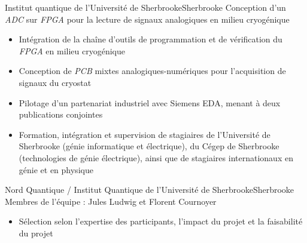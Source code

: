 
{Institut quantique de l'Université de Sherbrooke}{Sherbrooke}
{Conception d'un \textit{ADC} sur \textit{FPGA} pour la lecture de signaux analogiques en milieu cryogénique}
{\vspace{-12pt}
\begin{itemize}
    \item Intégration de la chaîne d'outils de programmation et de vérification du \textit{FPGA} en milieu cryogénique
    \item Conception de \textit{PCB} mixtes analogiques-numériques pour l'acquisition de signaux du cryostat
    \item Pilotage d'un partenariat industriel avec Siemens EDA, menant à deux publications conjointes
    \item Formation, intégration et supervision de stagiaires de l'Université de Sherbrooke (génie informatique et électrique), du Cégep de Sherbrooke (technologies de génie électrique), ainsi que de stagiaires internationaux en génie et en physique
\end{itemize}}


{Nord Quantique / Institut Quantique de l'Université de Sherbrooke}{Sherbrooke}
{Membres de l'équipe : Jules Ludwig et Florent Cournoyer}
{\vspace{-12pt}
\begin{itemize}
    \item Sélection selon l'expertise des participants, l'impact du projet et la faisabilité du projet 
\end{itemize}}
